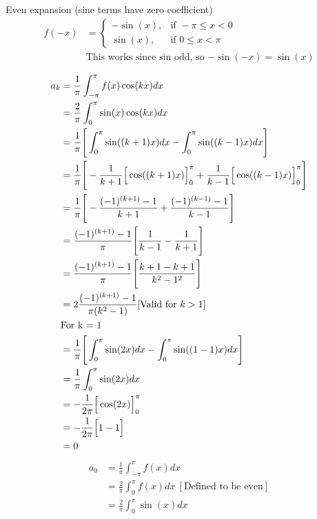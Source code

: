 \documentclass{article}
\begin{document}
\begin{enumerate}
    Even expansion (sine terms have zero coefficient)
    \begin{align*}
        f(-x) &= 
        \begin{cases}
            -\sin(x),&\text{if } -\pi \leq x < 0\\
            \sin(x), &\text{if } 0 \leq x < \pi
        \end{cases} \\&\text{This works since sin odd, so $-\sin(-x) = \sin(x)$} 
    \end{align*}
    \begin{multicols}{2}    
    \noindent
    \begin{align*}
        a_k &= \frac{1}{\pi}\int_{-\pi}^{\pi}f(x)\cos(kx)dx \\ 
        &= \frac{2}{\pi} \int_{0}^{\pi}\sin(x)\cos(kx)dx \\
        &= \frac{1}{\pi} \Bigg[ \int_{0}^{\pi}\sin((k+1)x)dx - \int_{0}^{\pi}\sin((k-1)x)dx\Bigg]\\
        &= \frac{1}{\pi} \Bigg[- \frac{1}{k+1}\Big[\cos((k+1)x) \Big]_{0}^{\pi} + \frac{1}{k-1}\Big[\cos((k-1)x)\Big]_{0}^{\pi}\Bigg]\\
        &= \frac{1}{\pi} \Bigg[- \frac{(-1)^{(k+1)} -1}{k+1} + \frac{(-1)^{(k-1)} -1}{k-1}\Bigg]\\
        &= \frac{(-1)^{(k+1)} -1}{\pi} \Bigg[\frac{1}{k-1} - \frac{1}{k+1}\Bigg]\\
        &= \frac{(-1)^{(k+1)} -1}{\pi} \Bigg[\frac{k + 1 - k + 1}{k^2-1^2}\Bigg]\\
        &= 2\frac{(-1)^{(k+1)} -1}{\pi(k^2 - 1)} [\text{Valid for $ k > 1$}] \\
        &\text{For k = 1}\\
        &= \frac{1}{\pi} \Bigg[ \int_{0}^{\pi}\sin(2x)dx - \int_{0}^{\pi}\sin((1-1)x)dx\Bigg]\\
        &= \frac{1}{\pi} \int_{0}^{\pi}\sin(2x)dx \\
        &= -\frac{1}{2\pi}\Big[\cos(2x)\Big]_{0}^{\pi} \\
        &= -\frac{1}{2\pi}\Big[1 - 1\Big] \\
        &= 0 \\
    \end{align*}
    \begin{align*}
        a_0 &= \frac{1}{\pi}\int_{-\pi}^{\pi}f(x)dx \\ 
        &= \frac{2}{\pi}\int_{0}^{\pi}f(x)dx\: [\text{Defined to be even}] \\ 
        &= \frac{2}{\pi} \int_{0}^{\pi}\sin(x)dx \\ 

\end{align*}
\end{multicols}
\end{enumerate}
\end{document}
